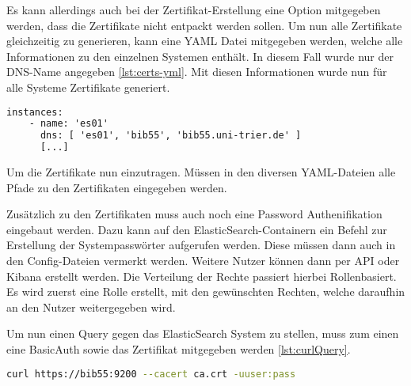 Es kann allerdings auch bei der Zertifikat-Erstellung eine Option mitgegeben werden, dass die Zertifikate nicht entpackt werden sollen. Um nun alle Zertifikate gleichzeitig zu generieren, kann eine YAML Datei mitgegeben werden, welche alle Informationen zu den einzelnen Systemen enthält. In diesem Fall wurde nur der DNS-Name angegeben \ref{lst:certs-yml}. Mit diesen Informationen wurde nun für alle Systeme Zertifikate generiert. 

\begin{lstlisting}[language=XML, frame=single, label={lst:certs-yml}] 
	instances:
	- name: 'es01'
	  dns: [ 'es01', 'bib55', 'bib55.uni-trier.de' ]
	  [...]
\end{lstlisting}

Um die Zertifikate nun einzutragen. Müssen in den diversen YAML-Dateien alle Pfade zu den Zertifikaten eingegeben werden. 

Zusätzlich zu den Zertifikaten muss auch noch eine Password Authenifikation eingebaut werden. Dazu kann auf den ElasticSearch-Containern ein Befehl zur Erstellung der Systempasswörter aufgerufen werden. Diese müssen dann auch in den Config-Dateien vermerkt werden. Weitere Nutzer können dann per API oder Kibana erstellt werden. Die Verteilung der Rechte passiert hierbei Rollenbasiert. Es wird zuerst eine Rolle erstellt, mit den gewünschten Rechten, welche daraufhin an den Nutzer weitergegeben wird.

Um nun einen Query gegen das ElasticSearch System zu stellen, muss zum einen eine BasicAuth sowie das Zertifikat mitgegeben werden \ref{lst:curlQuery}.

\begin{lstlisting}[language=BASH, frame=single, label={lst:curlQuery}] 
	curl https://bib55:9200 --cacert ca.crt -uuser:pass
\end{lstlisting}



